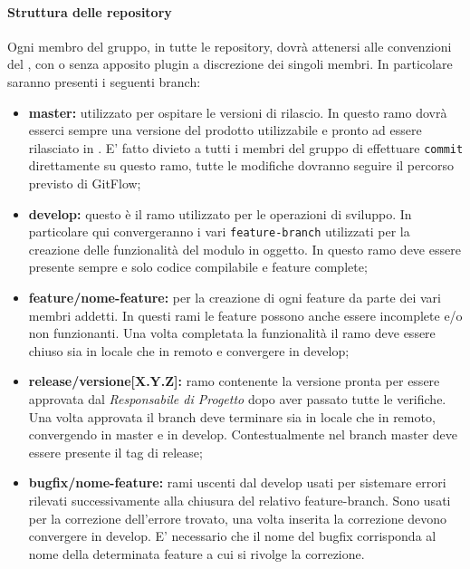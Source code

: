 \paragraph{Struttura delle repository}
Ogni membro del gruppo, in tutte le repository, dovrà attenersi alle convenzioni del , con o senza apposito plugin a discrezione dei singoli membri.
In particolare saranno presenti i seguenti branch:
\begin{itemize}
    \item \textbf{master:} utilizzato per ospitare le versioni di rilascio. In questo ramo dovrà esserci sempre una versione del prodotto utilizzabile
                           e pronto ad essere rilasciato in . E' fatto divieto a tutti i membri del gruppo di effettuare \verb|commit|
                           direttamente su questo ramo, tutte le modifiche dovranno seguire il percorso previsto di GitFlow;
    \item \textbf{develop:} questo è il ramo utilizzato per le operazioni di sviluppo. In particolare qui convergeranno i vari \verb|feature-branch|
                            utilizzati per la creazione delle funzionalità del modulo in oggetto. In questo ramo deve essere presente sempre e solo codice
                            compilabile e feature complete;
    \item \textbf{feature/nome-feature:} per la creazione di ogni feature da parte dei vari membri addetti. In questi rami le feature possono anche essere
                                         incomplete e/o non funzionanti. Una volta completata la funzionalità il ramo deve essere chiuso sia in locale che in remoto e 
                                         convergere in develop;
    \item \textbf{release/versione[X.Y.Z]:} ramo contenente la versione  pronta per essere approvata dal \textit{Responsabile di Progetto} dopo
                                            aver passato tutte le verifiche. Una volta approvata il branch deve terminare sia in locale che in remoto, convergendo in master e in develop.
                                            Contestualmente nel branch master deve essere presente il tag di release;
    \item \textbf{bugfix/nome-feature:} rami uscenti dal develop usati per sistemare errori rilevati successivamente alla chiusura del relativo feature-branch.
                                       Sono usati per la correzione dell'errore trovato, una volta inserita la correzione devono convergere in develop. E' necessario
                                       che il nome del bugfix corrisponda al nome della determinata feature a cui si rivolge la correzione.
\end{itemize}
